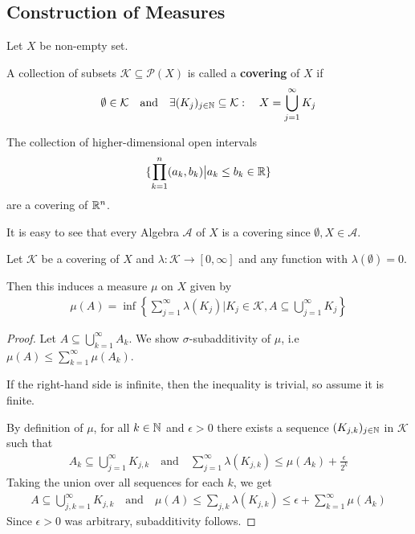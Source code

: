 \subsection{Construction of Measures}
Let $X$ be non-empty set.

\begin{dfn}[]\label{dfn:covering}
  A collection of subsets $\mathcal{K} \subseteq \mathcal{P}(X)$ is called a \textbf{covering} of $X$ if
  \begin{align*}
    \emptyset \in \mathcal{K} \quad \text{and} \quad \exists (K_j)_{j \in \mathbb{N}} \subseteq \mathcal{K}: \quad X = \bigcup_{j=1}^{\infty}K_j
  \end{align*}
\end{dfn}
\begin{ex}[]
  The collection of higher-dimensional open intervals
  \begin{align*}
    \{\prod_{k=1}^{n}(a_k,b_k) \big\vert a_k \leq b_k \in \mathbb{R}\}
  \end{align*}
  are a covering of $\mathbb{R}^{n}$.

  It is easy to see that every Algebra $\mathcal{A}$ of $X$ is a covering since $\emptyset,X \in \mathcal{A}$.
\end{ex}

\begin{thm}[] \label{thm:cover-to-measure}
  Let $\mathcal{K}$ be a covering of $X$ and $\lambda: \mathcal{K} \to [0,\infty]$ and any function with $\lambda(\emptyset) = 0$. 

  Then this induces a measure $\mu$ on $X$ given by
  \begin{align*}
    \mu(A) = \inf \left\{
      \sum_{j=1}^{\infty}\lambda(K_j) \big\vert
      K_j \in \mathcal{K}, A \subseteq \bigcup_{j=1}^{\infty}K_j
    \right\}
  \end{align*}
\end{thm}
\begin{proof}
  Let $A \subseteq \bigcup_{k=1}^{\infty} A_k$.
  We show $\sigma$-subadditivity of $\mu$, i.e $\mu(A) \leq \sum_{k=1}^{\infty}\mu(A_k)$.

  If the right-hand side is infinite, then the inequality is trivial, so assume it is finite.

  By definition of $\mu$, for all $k \in \mathbb{N}$ and $\epsilon > 0$ there exists a sequence $(K_{j,k})_{j \in \mathbb{N}}$ in $\mathcal{K}$ such that
  \begin{align*}
    A_k \subseteq \bigcup_{j=1}^{\infty}K_{j,k} \quad \text{and} \quad \sum_{j=1}^{\infty} \lambda(K_{j,k}) \leq \mu(A_k) + \frac{\epsilon}{2^{k}}
  \end{align*}
  Taking the union over all sequences for each $k$, we get
  \begin{align*}
    A \subseteq \bigcup_{j,k = 1}^{\infty} K_{j,k} \quad \text{and} \quad 
    \mu(A) \leq \sum_{j,k} \lambda(K_{j,k}) \leq \epsilon + \sum_{k=1}^{\infty} \mu(A_k)
  \end{align*}
  Since $\epsilon > 0$ was arbitrary, subadditivity follows.
\end{proof}

